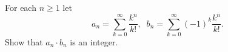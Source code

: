 For each \(n\geq 1\) let
\[a_{n}=\sum_{k=0}^{\infty}\frac{k^{n}}{k!}, \;\; b_{n}=\sum_{k=0}^{\infty}(-1)^{k}\frac{k^{n}}{k!}.\]Show that \(a_{n}\cdot b_{n}\) is an integer.